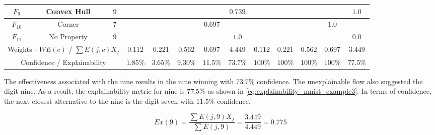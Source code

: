 \begin{table}[H]
{\begin{tabular}{| c | c | c | c | c | c | c | c || c | c | c | c | c |}
        \hline
        $F_9$& Convex Hull & $9$ &  &  &  &  & $0.739$ &  &  &  &  & $1.0$ \\
        \hline
        $F_{10}$& Corner & $7$ &  &  &  & $0.697$ &  &  &  &  & $1.0$ &  \\
        \hline
        $F_{11}$& No Property & $9$ &  &  &  &  & $1.0$ & & & & & $0.0$ \\
        \hline
        \hline
        \multicolumn{3}{|c|}{Weights - $WE(c)$ / $\sum E(j,c)X_j$} & $0.112$ & $0.221$ & $0.562$ & $0.697$ & $4.449$ & $0.112$ & $0.221$ & $0.562$ & $0.697$ & $3.449$ \\
        \cline{0-12}
        \multicolumn{3}{|c|}{Confidence / Explainability} & $1.85\%$ & $3.65\%$ & $9.30\%$ & $11.5\%$ & $73.7\%$ & $100\%$ & $100\%$ & $100\%$ & $100\%$ & $77.5\%$ \\
        \cline{0-12}
        \end{tabular}
        }
\end{table}

The effectiveness associated with the nine results in the nine winning with
$73.7\%$ confidence.  The unexplainable flow also suggested the digit nine. As a
result, the explainability metric for nine is $77.5\%$ as shown in
\eqref{eq:explainability_mnist_example3}.  In terms of confidence, the next
closest alternative to the nine is the digit seven with $11.5\%$ confidence.

\begin{equation}\label{eq:explainability_mnist_example3}
    Ex(9)=\frac{\sum{E(j,9)X_j}}{\sum{E(j,9)}} = \frac{3.449}{4.449}=0.775
\end{equation}


